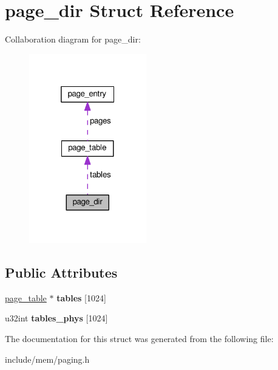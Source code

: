 \hypertarget{structpage__dir}{}\section{page\+\_\+dir Struct Reference}
\label{structpage__dir}


Collaboration diagram for page\+\_\+dir\+:
\nopagebreak
\begin{figure}[H]
\begin{center}
\leavevmode
\includegraphics[width=145pt]{structpage__dir__coll__graph}
\end{center}
\end{figure}
\subsection*{Public Attributes}
\begin{DoxyCompactItemize}
\item 
\hyperlink{structpage__table}{page\+\_\+table} $\ast$ {\bfseries tables} \mbox{[}1024\mbox{]}\hypertarget{structpage__dir_ac89434e3fccabfe9481ea77fdda82faf}{}\label{structpage__dir_ac89434e3fccabfe9481ea77fdda82faf}

\item 
u32int {\bfseries tables\+\_\+phys} \mbox{[}1024\mbox{]}\hypertarget{structpage__dir_a7336b695acaf516613dda626129129d0}{}\label{structpage__dir_a7336b695acaf516613dda626129129d0}

\end{DoxyCompactItemize}


The documentation for this struct was generated from the following file\+:\begin{DoxyCompactItemize}
\item 
include/mem/paging.\+h\end{DoxyCompactItemize}
